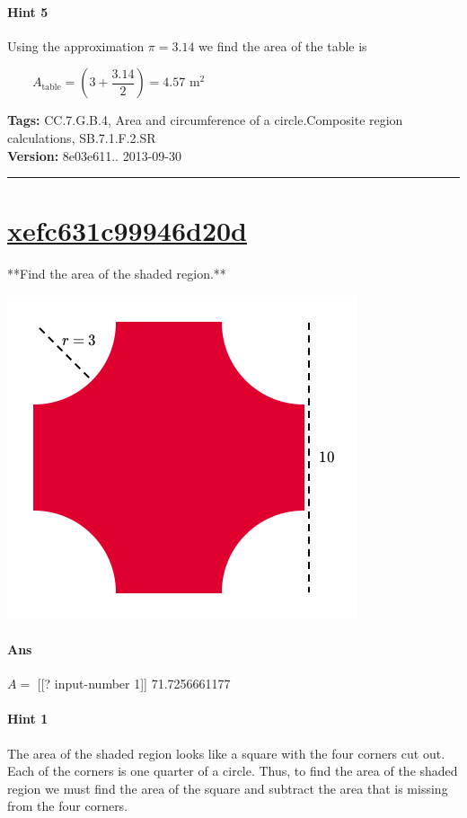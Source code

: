 \documentclass[twocolumn,10pt]{article}
\def\shrinkfactor{0.55}
\begin{document}
\paragraph{Hint 5}Using the approximation $\pi=3.14$ we find the area of the table is 

$\qquad A_{\text{table}} = \left(3+\dfrac{3.14}{2}\right) = 4.57\text{ m}^2$




\medskip
\noindent
\textbf{Tags:} {\footnotesize CC.7.G.B.4, Area and circumference of a circle.Composite region calculations, SB.7.1.F.2.SR}\\
\textbf{Version:} 8e03e611.. 2013-09-30
\smallskip\hrule





\section{\href{https://www.khanacademy.org/devadmin/content/items/xefc631c99946d20d}{xefc631c99946d20d}}

\noindent
**Find the area of the shaded region.**


\includegraphics[scale=\shrinkfactor]{figures/ec1d9546c0b030bf9e41bb394bf1c4337b8a1c2c.png}

\paragraph{Ans} $A =$ [[? input-number 1]]  71.7256661177

\paragraph{Hint 1}The area of the shaded region looks like a square with the four corners cut out. Each of the corners is one quarter of a circle. Thus, to find the area of the shaded region we must find the area of the square and subtract the area that is missing from the four corners.
\end{document}
